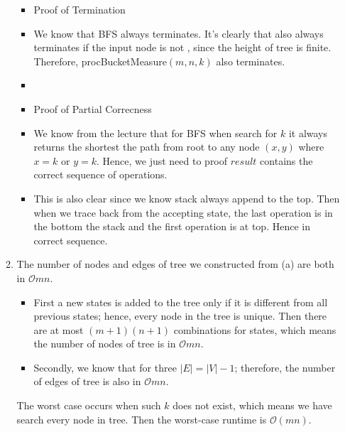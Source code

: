 \documentclass[11pt,twoside]{article}
\begin{document}
\begin{enumerate}[leftmargin=0pt]
\begin{enumerate}[topsep=\parsep]
		\begin{itemize}[label={}]
		\item Proof of Termination
		\item We know that BFS always terminates. It's clearly that   also always terminates if the input node is not  , since the height of tree is finite. Therefore, proc{BucketMeasure}$(m, n, k)$ also terminates.
		\item
		\item Proof of Partial Correcness
		\item We know from the lecture that for BFS when search for $k$ it always returns the shortest the path from root to any node $(x,y)$ where  $x = k$ or $y=k$. Hence, we just need to proof $result$ contains the correct sequence of operations.
		\item This is also clear since we know stack always append to the top. Then when we trace back from the accepting state, the last operation is in the bottom the stack and the first operation is at top. Hence in correct sequence.
		\end{itemize}	
	\item  {} The number of nodes and edges of tree we constructed from (a) are both in $\mathcal{O}{mn}$.
		\begin{itemize}[label={}]
		\item First a new states is added to the tree only if it is different from all previous states; hence, every node in the tree is unique. Then there are at most $(m+1)(n+1)$ combinations for states, which means the number of nodes  of tree is in $\mathcal{O}{mn}$.
		\item Secondly, we know that for three $|E| = |V| - 1$; therefore,  the number of edges  of tree is also in $\mathcal{O}{mn}$.
		\end{itemize}
		The worst case occurs when such $k$ does not exist, which means we have search every node in tree. Then the worst-case runtime is $\mathcal{O}{(mn)}$.
	\end{enumerate}	
\end{enumerate}
\end{document}

